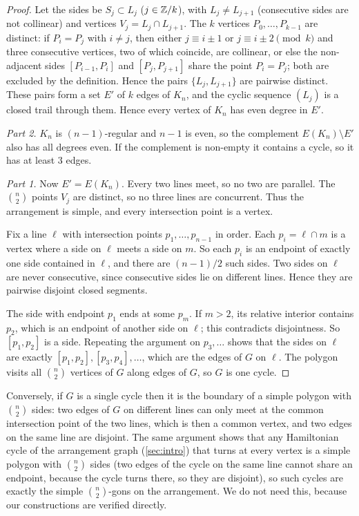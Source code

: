 \begin{proof}
Let the sides be $S_j\subset L_j$ ($j\in\mathbb Z/k$), with $L_j\ne L_{j+1}$ (consecutive sides are not
collinear) and vertices $V_j=L_j\cap L_{j+1}$. The $k$ vertices $P_0,\dots,P_{k-1}$ are distinct: if
$P_i=P_j$ with $i\ne j$, then either $j\equiv i\pm1$ or $j\equiv i\pm2\pmod k$ and three consecutive
vertices, two of which coincide, are collinear, or else the non-adjacent sides $[P_{i-1},P_i]$ and
$[P_j,P_{j+1}]$ share the point $P_i=P_j$; both are excluded by the definition. Hence the pairs
$\{L_j,L_{j+1}\}$ are pairwise distinct.
These pairs form a set $E'$ of $k$ edges of $K_n$, and the cyclic sequence $(L_j)$ is a closed trail
through them. Hence every vertex of $K_n$ has even degree in $E'$.

\emph{Part 2.} $K_n$ is $(n-1)$-regular and $n-1$ is even, so the complement $E(K_n)\setminus E'$ also
has all degrees even. If the complement is non-empty it contains a cycle, so it has at least $3$
edges.

\emph{Part 1.} Now $E'=E(K_n)$. Every two lines meet, so no two are parallel. The $\binom n2$ points
$V_j$ are distinct, so no three lines are concurrent. Thus the arrangement is simple, and every
intersection point is a vertex.

Fix a line $\ell$ with intersection points $p_1,\dots,p_{n-1}$ in order. Each $p_i=\ell\cap m$ is a
vertex where a side on $\ell$ meets a side on $m$. So each $p_i$ is an endpoint of exactly one side
contained in $\ell$, and there are $(n-1)/2$ such sides. Two sides on $\ell$ are never consecutive,
since consecutive sides lie on different lines. Hence they are pairwise disjoint closed segments.

The side with endpoint $p_1$ ends at some $p_m$. If $m>2$, its relative interior contains $p_2$, which
is an endpoint of another side on $\ell$; this contradicts disjointness. So $[p_1,p_2]$ is a side.
Repeating the argument on $p_3,\dots$ shows that the sides on $\ell$ are exactly
$[p_1,p_2],[p_3,p_4],\dots$, which are the edges of $G$ on $\ell$. The polygon visits all $\binom n2$
vertices of $G$ along edges of $G$, so $G$ is one cycle.
\end{proof}

\begin{remark}\label{rem:converse}
Conversely, if $G$ is a single cycle then it is the boundary of a simple polygon with $\binom n2$
sides: two edges of $G$ on different lines can only meet at the common intersection point of the two
lines, which is then a common vertex, and two edges on the same line are disjoint. The same argument
shows that any Hamiltonian cycle of the arrangement graph (\cref{sec:intro}) that turns at every vertex
is a simple polygon with $\binom n2$ sides (two edges of the cycle on the same line cannot share an
endpoint, because the cycle turns there, so they are disjoint), so such cycles are exactly the simple
$\binom n2$-gons on the arrangement. We do not need this, because our constructions are verified directly.
\end{remark}

